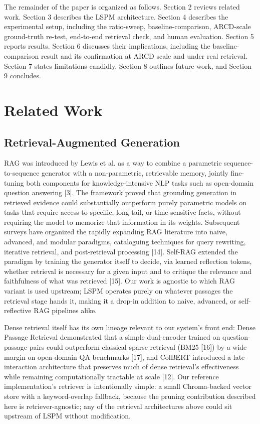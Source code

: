 The remainder of the paper is organized as follows. Section 2 reviews related work. Section 3 describes the LSPM architecture. Section 4 describes the experimental setup, including the ratio-sweep, baseline-comparison, ARCD-scale ground-truth re-test, end-to-end retrieval check, and human evaluation. Section 5 reports results. Section 6 discusses their implications, including the baseline-comparison result and its confirmation at ARCD scale and under real retrieval. Section 7 states limitations candidly. Section 8 outlines future work, and Section 9 concludes.

\section{Related Work}
\subsection{Retrieval-Augmented Generation}
RAG was introduced by Lewis et al. as a way to combine a parametric sequence-to-sequence generator with a non-parametric, retrievable memory, jointly fine-tuning both components for knowledge-intensive NLP tasks such as open-domain question answering [3]. The framework proved that grounding generation in retrieved evidence could substantially outperform purely parametric models on tasks that require access to specific, long-tail, or time-sensitive facts, without requiring the model to memorize that information in its weights. Subsequent surveys have organized the rapidly expanding RAG literature into naive, advanced, and modular paradigms, cataloguing techniques for query rewriting, iterative retrieval, and post-retrieval processing [14]. Self-RAG extended the paradigm by training the generator itself to decide, via learned reflection tokens, whether retrieval is necessary for a given input and to critique the relevance and faithfulness of what was retrieved [15]. Our work is agnostic to which RAG variant is used upstream; LSPM operates purely on whatever passages the retrieval stage hands it, making it a drop-in addition to naive, advanced, or self-reflective RAG pipelines alike.

Dense retrieval itself has its own lineage relevant to our system's front end: Dense Passage Retrieval demonstrated that a simple dual-encoder trained on question-passage pairs could outperform classical sparse retrieval (BM25 [16]) by a wide margin on open-domain QA benchmarks [17], and ColBERT introduced a late-interaction architecture that preserves much of dense retrieval's effectiveness while remaining computationally tractable at scale [12]. Our reference implementation's retriever is intentionally simple: a small Chroma-backed vector store with a keyword-overlap fallback, because the pruning contribution described here is retriever-agnostic; any of the retrieval architectures above could sit upstream of LSPM without modification.

